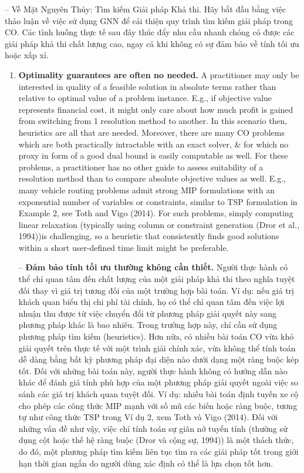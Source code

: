 \documentclass{article}
\begin{document}
\begin{itemize}
\begin{itemize}
        -- {\sf Về Mặt Nguyên Thủy: Tìm kiếm Giải pháp Khả thi.} Hãy bắt đầu bằng việc thảo luận về việc sử dụng GNN để cải thiện quy trình tìm kiếm giải pháp trong CO. Các tình huống thực tế sau đây thúc đẩy nhu cầu nhanh chóng có được các giải pháp khả thi chất lượng cao, ngay cả khi không có sự đảm bảo về tính tối ưu hoặc xấp xỉ.
        \begin{enumerate}
            \item {\bf Optimality guarantees are often no needed.} A practitioner may only be interested in quality of a feasible solution in absolute terms rather than relative to optimal value of a problem instance. E.g., if objective value represents financial cost, it might only care about how much profit is gained from switching from 1 resolution method to another. In this scenario then, heuristics are all that are needed. Moreover, there are many CO problems which are both practically intractable with an exact solver, \& for which no proxy in form of a good dual bound is easily computable as well. For these problems, a practitioner has no other guide to assess suitability of a resolution method than to compare absolute objective values as well. E.g., many vehicle routing problems admit strong MIP formulations with an exponential number of variables or constraints, similar to TSP formulation in Example 2, see Toth and Vigo (2014). For such problems, simply computing linear relaxation (typically using column or constraint generation (Dror  et al., 1994))is challenging, so a heuristic that consistently finds good solutions within a short user-defined time limit might be preferable.

            -- {\bf Đảm bảo tính tối ưu thường không cần thiết.} Người thực hành có thể chỉ quan tâm đến chất lượng của một giải pháp khả thi theo nghĩa tuyệt đối thay vì giá trị tương đối của một trường hợp bài toán. Ví dụ: nếu giá trị khách quan biểu thị chi phí tài chính, họ có thể chỉ quan tâm đến việc lợi nhuận thu được từ việc chuyển đổi từ phương pháp giải quyết này sang phương pháp khác là bao nhiêu. Trong trường hợp này, chỉ cần sử dụng phương pháp tìm kiếm (heuristics). Hơn nữa, có nhiều bài toán CO vừa khó giải quyết trên thực tế với một trình giải chính xác, vừa không thể tính toán dễ dàng bằng bất kỳ phương pháp đại diện nào dưới dạng một ràng buộc kép tốt. Đối với những bài toán này, người thực hành không có hướng dẫn nào khác để đánh giá tính phù hợp của một phương pháp giải quyết ngoài việc so sánh các giá trị khách quan tuyệt đối. Ví dụ: nhiều bài toán định tuyến xe cộ cho phép các công thức MIP mạnh với số mũ các biến hoặc ràng buộc, tương tự như công thức TSP trong Ví dụ 2, xem Toth và Vigo (2014). Đối với những vấn đề như vậy, việc chỉ tính toán sự giãn nở tuyến tính (thường sử dụng cột hoặc thế hệ ràng buộc (Dror và cộng sự, 1994)) là một thách thức, do đó, một phương pháp tìm kiếm liên tục tìm ra các giải pháp tốt trong giới hạn thời gian ngắn do người dùng xác định có thể là lựa chọn tốt hơn.
        \end{enumerate}
    \end{itemize}
\end{itemize}
\end{document}

